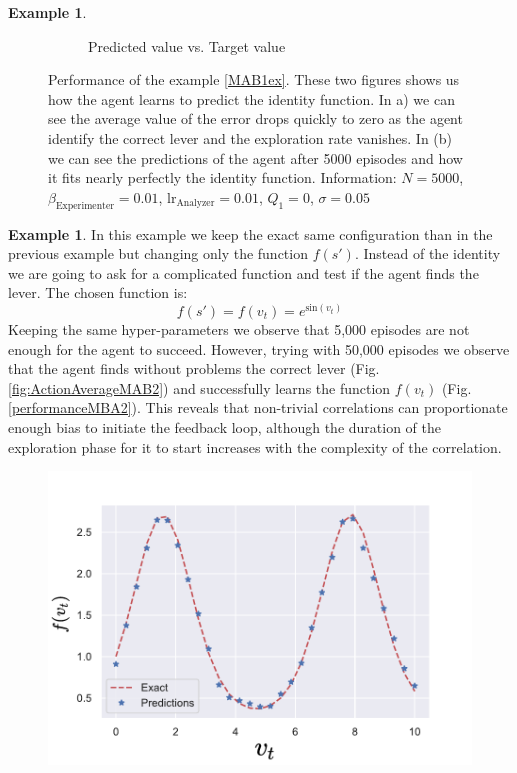 \documentclass[11pt,a4paper,twoside]{report}
\newcommand{\+}{\textnormal{+} }
\theoremstyle{definition}
\newtheorem{myex}[mythm]{Example}
\numberwithin{equation}{chapter}
\begin{document}
\begin{myex}
\begin{figure}[]
\begin{subfigure}{.5\textwidth}
        \caption{Predicted value vs. Target value}
        \label{fig:predictionsMAB1}
      \end{subfigure}
      \caption{Performance of the example \ref{MAB1ex}. These two figures shows
      us how the agent learns to predict the identity function. In a) we can see
      the average value of the error drops quickly to zero as the agent identify
      the correct lever and the exploration rate vanishes. In (b) we can see the
      predictions of the agent after 5000 episodes and how it fits nearly
      perfectly the identity function. Information: $N=5000$,
      $\beta_\text{Experimenter}=0.01$, $\text{lr}_\text{Analyzer}=0.01$,
      $Q_1=0$, $\sigma=0.05$}
    \end{figure} 
  \end{myex}
  \begin{myex} \label{MAB2ex}
    In this example we keep the exact same configuration than in the previous
    example but changing only the function $f(s')$. Instead of 
    the identity we are going to ask for a complicated function and test if the
    agent finds the lever. The chosen function is:
    \begin{equation}
      f(s')=f(v_t)= e^{\text{sin}(v_t)}
    \end{equation}
    Keeping the same hyper-parameters we observe that 5,000 episodes are not
    enough for the agent to succeed. However, trying with 50,000 episodes we
    observe that the agent finds without problems the correct lever (Fig.
    \ref{fig:ActionAverageMAB2}) and successfully learns the function $f(v_t)$
    (Fig. \ref{performanceMBA2}). This reveals that non-trivial correlations can
    proportionate enough bias to initiate the feedback loop, although the
    duration of the exploration phase for it to start increases 
    with the complexity of the correlation.


    \begin{figure}
      \centering
      \includegraphics[scale=0.5]{figures/performanceMBA2 edited.pdf}


\end{figure}
\end{myex}
\end{document}
